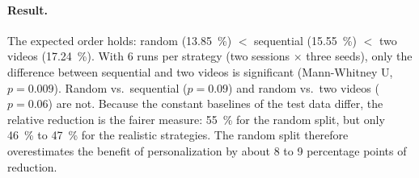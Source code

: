 \begin{table}[htbp]
  \centering
  \caption[Strategies for splitting the data]{Strategies for splitting the data (sessions 21 and 22, base model
           , original labels). Mean over three seeds; SD:
           standard deviation of the test error over the seeds; Base: unchanged
           base model; Red.: reduction of the test error relative to the
           constant baseline; $n$: training / validation / test frames; $t$:
           duration of one run (s).}
  \label{tab:loading}
  \footnotesize
  \setlength{\tabcolsep}{3.5pt}
\end{table}

\paragraph{Result.} The expected order holds: random (\SI{13.85}{\percent})
$<$ sequential (\SI{15.55}{\percent}) $<$ two videos (\SI{17.24}{\percent}).
With 6 runs per strategy (two sessions $\times$ three seeds), only the
difference between sequential and two videos is significant (Mann-Whitney U,
$p=0.009$). Random vs.\ sequential ($p=0.09$) and random vs.\ two videos
($p=0.06$) are not. Because the constant baselines of the test data differ, the
relative reduction is the fairer measure: \SI{55}{\percent} for the random split,
but only \SI{46}{\percent} to \SI{47}{\percent} for the realistic strategies. The
random split therefore overestimates the benefit of personalization by about 8
to 9 percentage points of reduction.

